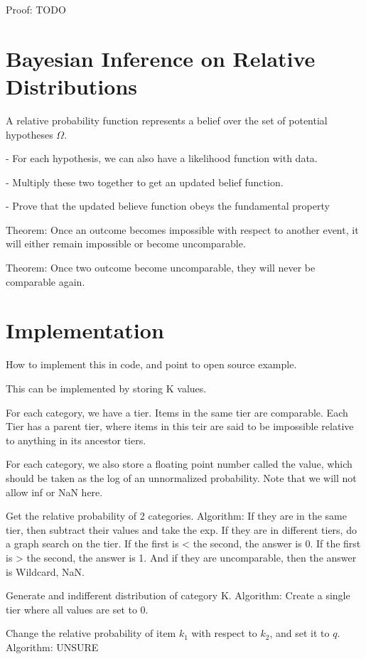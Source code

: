 \documentclass[twoside]{article}
\begin{document}
Proof: TODO

\section{Bayesian Inference on Relative Distributions}

A relative probability function represents a belief over the set of potential hypotheses \(\Omega\).

- For each hypothesis, we can also have a likelihood function with data.

- Multiply these two together to get an updated belief function.

- Prove that the updated believe function obeys the fundamental property

Theorem: Once an outcome becomes impossible with respect to another event, it will either remain impossible or become uncomparable.

Theorem: Once two outcome  become uncomparable, they will never be comparable again.

\section{Implementation}

How to implement this in code, and point to open source example.

This can be implemented by storing K values.

For each category, we have a tier. Items in the same tier are comparable. Each Tier has a parent tier, where items in this teir are said to be impossible relative to anything in its ancestor tiers.

For each category, we also store a floating point number called the value, which should be taken as the log of an unnormalized probability. Note that we will not allow inf or NaN here.

Get the relative probability of 2 categories. Algorithm: If they are in the same tier, then subtract their values and take the exp. If they are in different tiers, do a graph search on the tier. If the first is < the second, the answer is 0. If the first is > the second, the answer is 1. And if they are uncomparable, then the answer is Wildcard, NaN.

Generate and indifferent distribution of category K. Algorithm: Create a single tier where all values are set to 0.

Change the relative probability of item \(k_1\) with respect to \(k_2\), and set it to \(q\). Algorithm: UNSURE
\end{document}
